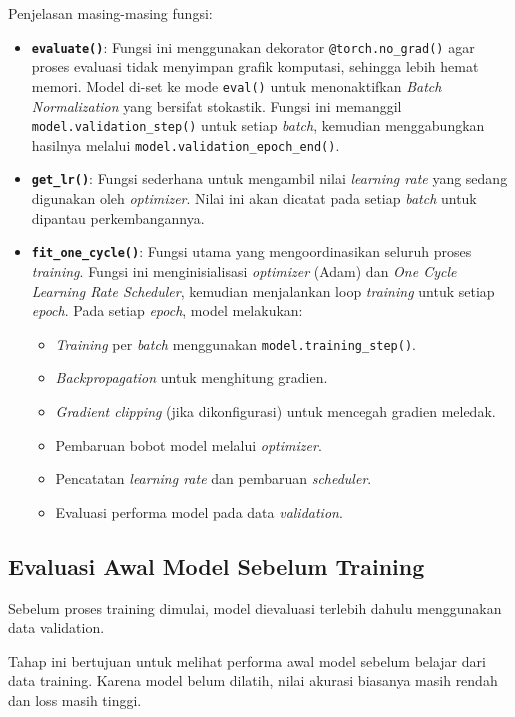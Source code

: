 Penjelasan masing-masing fungsi:

\begin{itemize}
    \item \textbf{\texttt{evaluate()}}: Fungsi ini menggunakan dekorator \texttt{@torch.no\_grad()} agar proses evaluasi tidak menyimpan grafik komputasi, sehingga lebih hemat memori. Model di-set ke mode \texttt{eval()} untuk menonaktifkan \textit{Batch Normalization} yang bersifat stokastik. Fungsi ini memanggil \texttt{model.validation\_step()} untuk setiap \textit{batch}, kemudian menggabungkan hasilnya melalui \texttt{model.validation\_epoch\_end()}.
    \item \textbf{\texttt{get\_lr()}}: Fungsi sederhana untuk mengambil nilai \textit{learning rate} yang sedang digunakan oleh \textit{optimizer}. Nilai ini akan dicatat pada setiap \textit{batch} untuk dipantau perkembangannya.
    \item \textbf{\texttt{fit\_one\_cycle()}}: Fungsi utama yang mengoordinasikan seluruh proses \textit{training}. Fungsi ini menginisialisasi \textit{optimizer} (Adam) dan \textit{One Cycle Learning Rate Scheduler}, kemudian menjalankan loop \textit{training} untuk setiap \textit{epoch}. Pada setiap \textit{epoch}, model melakukan:\begin{itemize}
        \item \textit{Training} per \textit{batch} menggunakan \texttt{model.training\_step()}.
        \item \textit{Backpropagation} untuk menghitung gradien.
        \item \textit{Gradient clipping} (jika dikonfigurasi) untuk mencegah gradien meledak.
        \item Pembaruan bobot model melalui \textit{optimizer}.
        \item Pencatatan \textit{learning rate} dan pembaruan \textit{scheduler}.
        \item Evaluasi performa model pada data \textit{validation}.
    \end{itemize}
\end{itemize}

\subsection{Evaluasi Awal Model Sebelum Training}

Sebelum proses training dimulai, model dievaluasi terlebih dahulu menggunakan data validation.

Tahap ini bertujuan untuk melihat performa awal model sebelum belajar dari data training. Karena model belum dilatih, nilai akurasi biasanya masih rendah dan loss masih tinggi.

